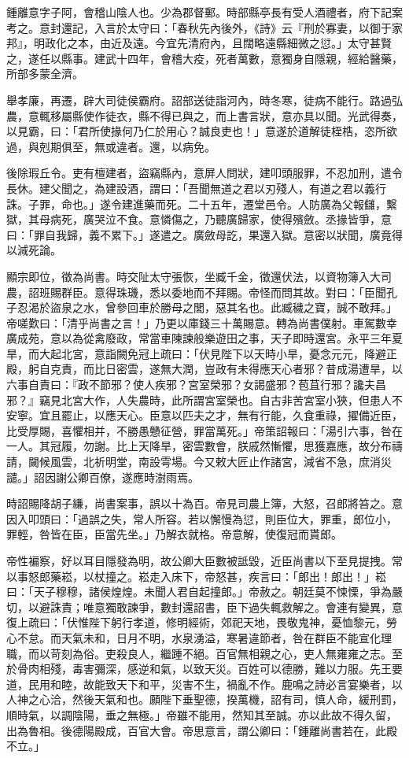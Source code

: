 \begin{pinyinscope}
鍾離意字子阿，會稽山陰人也。少為郡督郵。時部縣亭長有受人酒禮者，府下記案考之。意封還記，入言於太守曰：「春秋先內後外，《詩》云『刑於寡妻，以御于家邦』，明政化之本，由近及遠。今宜先清府內，且闊略遠縣細微之愆。」太守甚賢之，遂任以縣事。建武十四年，會稽大疫，死者萬數，意獨身自隱親，經給醫藥，所部多蒙全濟。

舉孝廉，再遷，辟大司徒侯霸府。詔部送徒詣河內，時冬寒，徒病不能行。路過弘農，意輒移屬縣使作徒衣，縣不得已與之，而上書言狀，意亦具以聞。光武得奏，以見霸，曰：「君所使掾何乃仁於用心？誠良吏也！」意遂於道解徒桎梏，恣所欲過，與剋期俱至，無或違者。還，以病免。

後除瑕丘令。吏有檀建者，盜竊縣內，意屏人問狀，建叩頭服罪，不忍加刑，遣令長休。建父聞之，為建設酒，謂曰：「吾聞無道之君以刃殘人，有道之君以義行誅。子罪，命也。」遂令建進藥而死。二十五年，遷堂邑令。人防廣為父報讎，繫獄，其母病死，廣哭泣不食。意憐傷之，乃聽廣歸家，使得殯斂。丞掾皆爭，意曰：「罪自我歸，義不累下。」遂遣之。廣斂母訖，果還入獄。意密以狀聞，廣竟得以減死論。

顯宗即位，徵為尚書。時交阯太守張恢，坐臧千金，徵還伏法，以資物簿入大司農，詔班賜群臣。意得珠璣，悉以委地而不拜賜。帝怪而問其故。對曰：「臣聞孔子忍渴於盜泉之水，曾參回車於勝母之閭，惡其名也。此臧穢之寶，誠不敢拜。」帝嗟歎曰：「清乎尚書之言！」乃更以庫錢三十萬賜意。轉為尚書僕射。車駕數幸廣成苑，意以為從禽廢政，常當車陳諫般樂遊田之事，天子即時還宮。永平三年夏旱，而大起北宮，意詣闕免冠上疏曰：「伏見陛下以天時小旱，憂念元元，降避正殿，躬自克責，而比日密雲，遂無大潤，豈政有未得應天心者邪？昔成湯遭旱，以六事自責曰：『政不節邪？使人疾邪？宮室榮邪？女謁盛邪？苞苴行邪？讒夫昌邪？』竊見北宮大作，人失農時，此所謂宮室榮也。自古非苦宮室小狹，但患人不安寧。宜且罷止，以應天心。臣意以匹夫之才，無有行能，久食重祿，擢備近臣，比受厚賜，喜懼相并，不勝愚戇征營，罪當萬死。」帝策詔報曰：「湯引六事，咎在一人。其冠履，勿謝。比上天降旱，密雲數會，朕戚然慚懼，思獲嘉應，故分布禱請，闚候風雲，北祈明堂，南設雩場。今又敕大匠止作諸宮，減省不急，庶消災譴。」詔因謝公卿百僚，遂應時澍雨焉。

時詔賜降胡子縑，尚書案事，誤以十為百。帝見司農上簿，大怒，召郎將笞之。意因入叩頭曰：「過誤之失，常人所容。若以懈慢為愆，則臣位大，罪重，郎位小，罪輕，咎皆在臣，臣當先坐。」乃解衣就格。帝意解，使復冠而貰郎。

帝性褊察，好以耳目隱發為明，故公卿大臣數被詆毀，近臣尚書以下至見提拽。常以事怒郎藥崧，以杖撞之。崧走入床下，帝怒甚，疾言曰：「郎出！郎出！」崧曰：「天子穆穆，諸侯煌煌。未聞人君自起撞郎。」帝赦之。朝廷莫不悚慄，爭為嚴切，以避誅責；唯意獨敢諫爭，數封還詔書，臣下過失輒救解之。會連有變異，意復上疏曰：「伏惟陛下躬行孝道，修明經術，郊祀天地，畏敬鬼神，憂恤黎元，勞心不怠。而天氣未和，日月不明，水泉湧溢，寒暑違節者，咎在群臣不能宣化理職，而以苛刻為俗。吏殺良人，繼踵不絕。百官無相親之心，吏人無雍雍之志。至於骨肉相殘，毒害彌深，感逆和氣，以致天災。百姓可以德勝，難以力服。先王要道，民用和睦，故能致天下和平，災害不生，禍亂不作。鹿鳴之詩必言宴樂者，以人神之心洽，然後天氣和也。願陛下垂聖德，揆萬機，詔有司，慎人命，緩刑罰，順時氣，以調陰陽，垂之無極。」帝雖不能用，然知其至誠。亦以此故不得久留，出為魯相。後德陽殿成，百官大會。帝思意言，謂公卿曰：「鍾離尚書若在，此殿不立。」


\end{pinyinscope}
